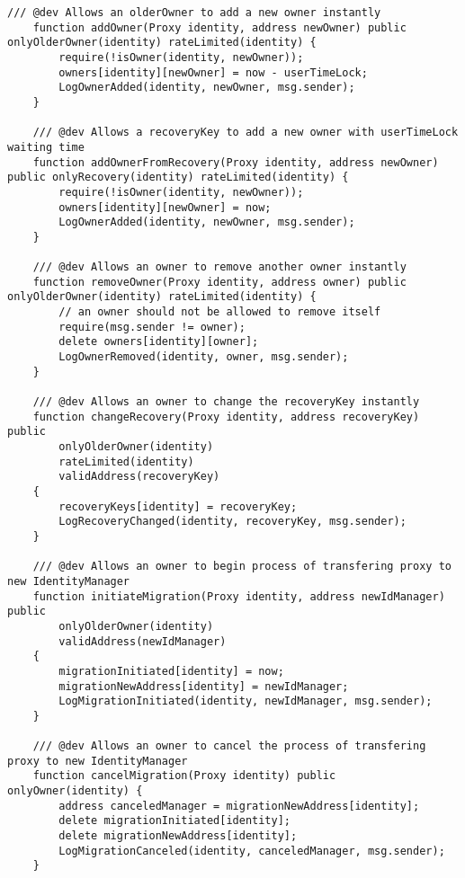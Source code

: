 \begin{itemize}
\begin{lstlisting}[language=Solidity]
    /// @dev Allows an olderOwner to add a new owner instantly
    function addOwner(Proxy identity, address newOwner) public onlyOlderOwner(identity) rateLimited(identity) {
        require(!isOwner(identity, newOwner));
        owners[identity][newOwner] = now - userTimeLock;
        LogOwnerAdded(identity, newOwner, msg.sender);
    }

    /// @dev Allows a recoveryKey to add a new owner with userTimeLock waiting time
    function addOwnerFromRecovery(Proxy identity, address newOwner) public onlyRecovery(identity) rateLimited(identity) {
        require(!isOwner(identity, newOwner));
        owners[identity][newOwner] = now;
        LogOwnerAdded(identity, newOwner, msg.sender);
    }

    /// @dev Allows an owner to remove another owner instantly
    function removeOwner(Proxy identity, address owner) public onlyOlderOwner(identity) rateLimited(identity) {
        // an owner should not be allowed to remove itself
        require(msg.sender != owner);
        delete owners[identity][owner];
        LogOwnerRemoved(identity, owner, msg.sender);
    }

    /// @dev Allows an owner to change the recoveryKey instantly
    function changeRecovery(Proxy identity, address recoveryKey) public
        onlyOlderOwner(identity)
        rateLimited(identity)
        validAddress(recoveryKey)
    {
        recoveryKeys[identity] = recoveryKey;
        LogRecoveryChanged(identity, recoveryKey, msg.sender);
    }

    /// @dev Allows an owner to begin process of transfering proxy to new IdentityManager
    function initiateMigration(Proxy identity, address newIdManager) public
        onlyOlderOwner(identity)
        validAddress(newIdManager)
    {
        migrationInitiated[identity] = now;
        migrationNewAddress[identity] = newIdManager;
        LogMigrationInitiated(identity, newIdManager, msg.sender);
    }

    /// @dev Allows an owner to cancel the process of transfering proxy to new IdentityManager
    function cancelMigration(Proxy identity) public onlyOwner(identity) {
        address canceledManager = migrationNewAddress[identity];
        delete migrationInitiated[identity];
        delete migrationNewAddress[identity];
        LogMigrationCanceled(identity, canceledManager, msg.sender);
    }


\end{lstlisting}
\end{itemize}
